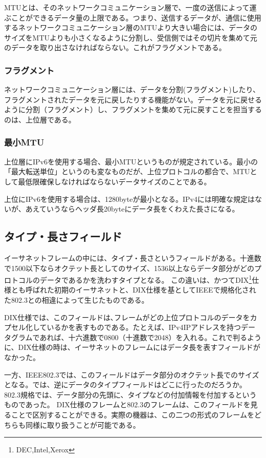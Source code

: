 MTUとは、そのネットワークコミュニケーション層で、一度の送信によって運ぶことができるデータ量の上限である。つまり、送信するデータが、通信に使用するネットワークコミュニケーション層のMTUより大きい場合には、データのサイズをMTUよりも小さくなるように分割し、受信側ではその切片を集めて元のデータを取り出さなければならない。これがフラグメントである。

\subsubsection{フラグメント}
ネットワークコミュニケーション層には、データを分割(フラグメント)したり、フラグメントされたデータを元に戻したりする機能がない。データを元に戻せるように分割（フラグメント）し、フラグメントを集めて元に戻すことを担当するのは、上位層である。



\subsubsection{最小MTU}
上位層にIPv6を使用する場合、最小MTUというものが規定されている。最小の「最大転送単位」というのも変なものだが、上位プロトコルの都合で、MTUとして最低限確保しなければならないデータサイズのことである。

上位にIPv6を使用する場合は、1280byteが最小となる。IPv4には明確な規定はないが、あえていうならヘッダ長20byteにデータ長をくわえた長さになる。

\subsection{タイプ・長さフィールド}
イーサネットフレームの中には、タイプ・長さというフィールドがある。十進数で1500以下ならオクテット長としてのサイズ、1536以上ならデータ部分がどのプロトコルのデータであるかを洗わすタイプとなる。
この違いは、かつてDIX\footnote{DEC,Intel,Xerox}仕様とも呼ばれた初期のイーサネットと、DIX仕様を基としてIEEEで規格化された802.3との相違によって生じたものである。

DIX仕様では、このフィールドは､フレームがどの上位プロトコルのデータをカプセル化しているかを表すものである。たとえば、IPv4IPアドレスを持つデータグラムであれば、十六進数で0800（十進数で2048）を入れる。これで判るように、DIX仕様の時は、イーサネットのフレームにはデータ長を表すフィールドがなかった。

一方、IEEE802.3では、このフィールドはデータ部分のオクテット長でのサイズとなる。では、逆にデータのタイプフィールドはどこに行ったのだろうか。802.3規格では、データ部分の先頭に、タイプなどの付加情報を付加するというものであった。
DIX仕様のフレームと802.3のフレームは、このフィールドを見ることで区別することができる。実際の機器は、この二つの形式のフレームをどちらも同様に取り扱うことが可能である。

